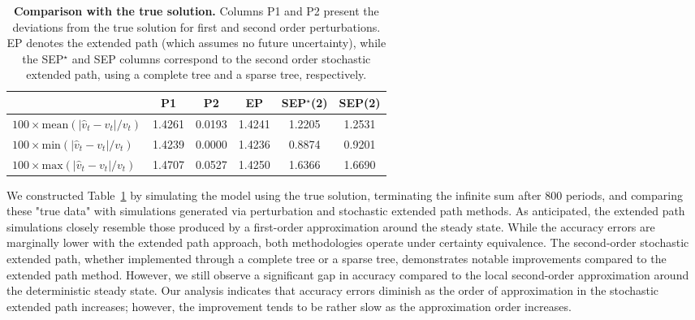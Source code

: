 \documentclass[a4paper,11pt]{amsart}
\begin{document}
\begin{table}[H]
   \centering
   \begin{tabular}{l | S[table-format=1.4] S[table-format=1.4] |  S[table-format=1.4]  | S[table-format=1.4] S[table-format=1.4]}
      \hline
                                                     & {P1}   & {P2}   & {EP}   & {SEP$^{\star}$(2)} & {SEP(2)} \\
      \hline\hline
      $100\times\textrm{mean}(|\hat v_t - v_t|/v_t)$ & 1.4261 & 0.0193 & 1.4241 & 1.2205             & 1.2531   \\
      $100\times\textrm{min}(|\hat v_t - v_t|/v_t)$  & 1.4239 & 0.0000 & 1.4236 & 0.8874             & 0.9201   \\
      $100\times\textrm{max}(|\hat v_t - v_t|/v_t)$  & 1.4707 & 0.0527 & 1.4250 & 1.6366             & 1.6690   \\
      \hline
   \end{tabular}
   \caption{\textbf{Comparison with the true solution.} Columns P1 and
      P2 present the deviations from the true solution for first and
      second order perturbations. EP denotes the extended path (which
      assumes no future uncertainty), while the SEP$^{\star}$ and SEP
      columns correspond to the second order stochastic extended path,
      using a complete tree and a sparse tree, respectively.}
   \label{table:1}
\end{table}




We constructed Table~\ref{table:1} by simulating the model using the
true solution, terminating the infinite sum after 800 periods, and
comparing these "true data" with simulations generated via
perturbation and stochastic extended path methods. As anticipated, the
extended path simulations closely resemble those produced by a
first-order approximation around the steady state. While the accuracy
errors are marginally lower with the extended path approach, both
methodologies operate under certainty equivalence. The second-order
stochastic extended path, whether implemented through a complete tree
or a sparse tree, demonstrates notable improvements compared to the
extended path method. However, we still observe a significant gap in
accuracy compared to the local second-order approximation around the
deterministic steady state. Our analysis indicates that accuracy
errors diminish as the order of approximation in the stochastic
extended path increases; however, the improvement tends to be rather
slow as the approximation order increases.\newline
\end{document}
